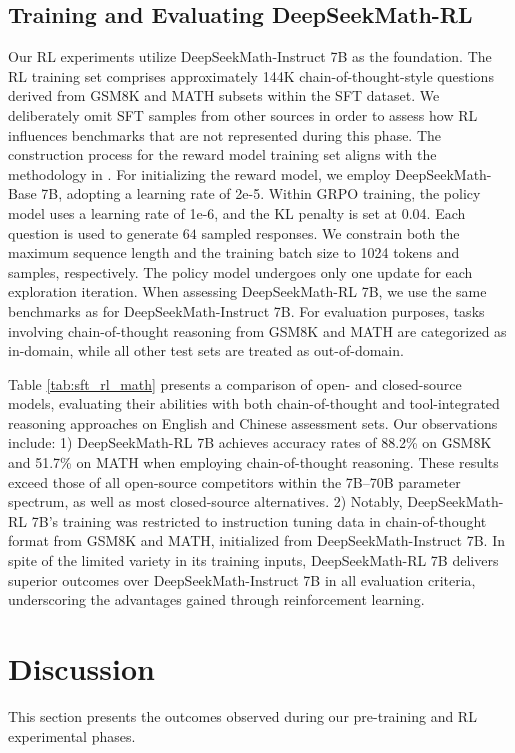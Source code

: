 \begin{itemize}[topsep=0pt]
\begin{itemize}[topsep=0pt]
\subsection{Training and Evaluating DeepSeekMath-RL}

Our RL experiments utilize DeepSeekMath-Instruct 7B as the foundation. The RL training set comprises approximately 144K chain-of-thought-style questions derived from GSM8K and MATH subsets within the SFT dataset. We deliberately omit SFT samples from other sources in order to assess how RL influences benchmarks that are not represented during this phase. The construction process for the reward model training set aligns with the methodology in \citep{wang2023math}. For initializing the reward model, we employ DeepSeekMath-Base 7B, adopting a learning rate of 2e-5. Within GRPO training, the policy model uses a learning rate of 1e-6, and the KL penalty is set at 0.04. Each question is used to generate $64$ sampled responses. We constrain both the maximum sequence length and the training batch size to 1024 tokens and samples, respectively. The policy model undergoes only one update for each exploration iteration. When assessing DeepSeekMath-RL 7B, we use the same benchmarks as for DeepSeekMath-Instruct 7B. For evaluation purposes, tasks involving chain-of-thought reasoning from GSM8K and MATH are categorized as in-domain, while all other test sets are treated as out-of-domain.

Table \ref{tab:sft_rl_math} presents a comparison of open- and closed-source models, evaluating their abilities with both chain-of-thought and tool-integrated reasoning approaches on English and Chinese assessment sets. Our observations include: 1) DeepSeekMath-RL 7B achieves accuracy rates of 88.2\% on GSM8K and 51.7\% on MATH when employing chain-of-thought reasoning. These results exceed those of all open-source competitors within the 7B–70B parameter spectrum, as well as most closed-source alternatives. 2) Notably, DeepSeekMath-RL 7B’s training was restricted to instruction tuning data in chain-of-thought format from GSM8K and MATH, initialized from DeepSeekMath-Instruct 7B. In spite of the limited variety in its training inputs, DeepSeekMath-RL 7B delivers superior outcomes over DeepSeekMath-Instruct 7B in all evaluation criteria, underscoring the advantages gained through reinforcement learning.

\section{Discussion}
This section presents the outcomes observed during our pre-training and RL experimental phases.


\end{itemize}
\end{itemize}
